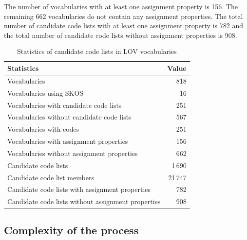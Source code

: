The number of vocabularies with at least one assignment property is 156. The remaining 662 vocabularies do not contain any assignment properties. The total number of candidate code lists with at least one assignment property is 782 and the total number of candidate code lists without assignment properties is 908.

\begin{table}[h]
\footnotesize
\centering
\begin{tabular}{|l|r|}
\hline
\textbf{Statistics}                                         & \textbf{Value} \\ \hline
Vocabularies                                                & 818            \\ \hline
Vocabularies using SKOS                                     & 16             \\ \hline
Vocabularies with candidate code lists                      & 251            \\ \hline
Vocabularies without candidate code lists                   & 567            \\ \hline
Vocabularies with codes                                     & 251            \\ \hline
Vocabularies with assignment properties                     & 156            \\ \hline
Vocabularies without assignment properties                  & 662            \\ \hline
Candidate code lists                                        & 1\,690         \\ \hline
Candidate code list members                                 & 21\,747        \\ \hline
Candidate code lists with assignment properties             & 782            \\ \hline
Candidate code lists without assignment properties          & 908            \\ \hline
\end{tabular}
\caption{Statistics of candidate code lists in LOV vocabularies}
\label{tab:lov-code-list-stats} 
\end{table}

\subsection{Complexity of the process}

